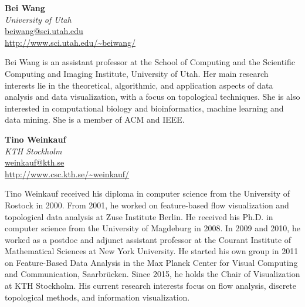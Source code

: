 \documentclass[preprint,journal]{vgtc}       %
\newcommand{\addverticalspace}{\vspace{3mm}}
\begin{document}
\printbibliography[title={Relevant Publications},category=Tao]

\noindent \textbf{Bei Wang}\\
\emph{University of Utah}\\
\href{mailto:beiwang@sci.utah.edu}{beiwang@sci.utah.edu}\\
\url{http://www.sci.utah.edu/~beiwang/}

\addverticalspace
Bei Wang is an assistant professor at the School of Computing and the Scientific Computing and Imaging Institute, University of Utah. Her main research interests lie in the theoretical, algorithmic, and application aspects of data analysis and data visualization, with a focus on topological techniques. She is also interested in computational biology and bioinformatics, machine learning and data mining. She is a member of ACM and IEEE.
\addverticalspace

\printbibliography[title={Relevant Publications},category=Wang]

\noindent \textbf{Tino Weinkauf}\\
\emph{KTH Stockholm}\\
\href{mailto:weinkauf@kth.se}{weinkauf@kth.se}\\
\url{http://www.csc.kth.se/~weinkauf/}

\addverticalspace
Tino Weinkauf received his diploma in computer science from the University of Rostock in 2000. From 2001, he worked on feature-based flow visualization and topological data analysis at Zuse Institute Berlin. He received his Ph.D. in computer science from the University of Magdeburg in 2008. In 2009 and 2010, he worked as a postdoc and adjunct assistant professor at the Courant Institute of Mathematical Sciences at New York University. He started his own group in 2011 on Feature-Based Data Analysis in the Max Planck Center for Visual Computing and Communication, Saarbrücken. Since 2015, he holds the Chair of Visualization at KTH Stockholm. His current research interests focus on flow analysis, discrete topological methods, and information visualization.

\printbibliography[title={Relevant Publications},category=Weinkauf]

\printbibliography[title={Other References},category=Other]


% 
% 
\end{document}
